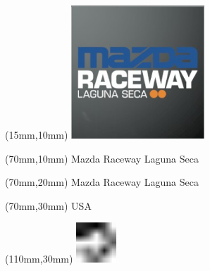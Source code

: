 \null\newpage
\begin{textblock*}{50mm}(15mm,10mm)%
\includegraphics[width=50mm]{LG/2015-05-20_00085.png}
\end{textblock*}
\begin{textblock*}{130mm}(70mm,10mm)%
{\fontsize{20}{20}\selectfont Mazda Raceway Laguna Seca}\\
\end{textblock*}
\begin{textblock*}{120mm}(70mm,20mm)%
{\fontsize{16}{16}\selectfont Mazda Raceway Laguna Seca}\\
\end{textblock*}
\begin{textblock*}{120mm}(70mm,30mm)%
{\fontsize{12}{12}\selectfont USA}
\end{textblock*}
\begin{textblock*}{30mm}(110mm,30mm)%
\centering
\includegraphics[height=15mm]{icons/fa-rotate-left.pdf}
\end{textblock*}
